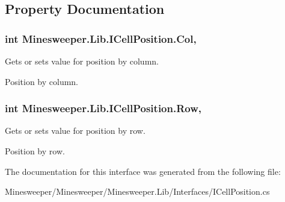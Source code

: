 \subsection{Property Documentation}
\hypertarget{interface_minesweeper_1_1_lib_1_1_i_cell_position_aca8beb37824e81653e0b2425a2dd475e}{
\subsubsection[{Col}]{\setlength{\rightskip}{0pt plus 5cm}int Minesweeper.\+Lib.\+I\+Cell\+Position.\+Col\hspace{0.3cm}{\ttfamily [get]}, {\ttfamily [set]}}}\label{interface_minesweeper_1_1_lib_1_1_i_cell_position_aca8beb37824e81653e0b2425a2dd475e}


Gets or sets value for position by column. 

Position by column.\hypertarget{interface_minesweeper_1_1_lib_1_1_i_cell_position_a41fc9d6cadddc3e5c66d01746f74f823}{
\subsubsection[{Row}]{\setlength{\rightskip}{0pt plus 5cm}int Minesweeper.\+Lib.\+I\+Cell\+Position.\+Row\hspace{0.3cm}{\ttfamily [get]}, {\ttfamily [set]}}}\label{interface_minesweeper_1_1_lib_1_1_i_cell_position_a41fc9d6cadddc3e5c66d01746f74f823}


Gets or sets value for position by row. 

Position by row.

The documentation for this interface was generated from the following file\+:\begin{DoxyCompactItemize}
\item 
Minesweeper/\+Minesweeper/\+Minesweeper.\+Lib/\+Interfaces/I\+Cell\+Position.\+cs\end{DoxyCompactItemize}
